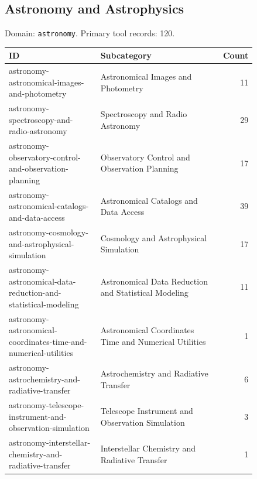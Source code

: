 \subsection{Astronomy and Astrophysics}
\noindent Domain: \texttt{astronomy}. Primary tool records: 120.
\begin{longtable}{p{0.37\linewidth}p{0.47\linewidth}r}
ID & Subcategory & Count\\\hline\endhead
astronomy-astronomical-images-and-photometry & Astronomical Images and Photometry & 11\\
astronomy-spectroscopy-and-radio-astronomy & Spectroscopy and Radio Astronomy & 29\\
astronomy-observatory-control-and-observation-planning & Observatory Control and Observation Planning & 17\\
astronomy-astronomical-catalogs-and-data-access & Astronomical Catalogs and Data Access & 39\\
astronomy-cosmology-and-astrophysical-simulation & Cosmology and Astrophysical Simulation & 17\\
astronomy-astronomical-data-reduction-and-statistical-modeling & Astronomical Data Reduction and Statistical Modeling & 11\\
astronomy-astronomical-coordinates-time-and-numerical-utilities & Astronomical Coordinates Time and Numerical Utilities & 1\\
astronomy-astrochemistry-and-radiative-transfer & Astrochemistry and Radiative Transfer & 6\\
astronomy-telescope-instrument-and-observation-simulation & Telescope Instrument and Observation Simulation & 3\\
astronomy-interstellar-chemistry-and-radiative-transfer & Interstellar Chemistry and Radiative Transfer & 1\\
\end{longtable}
